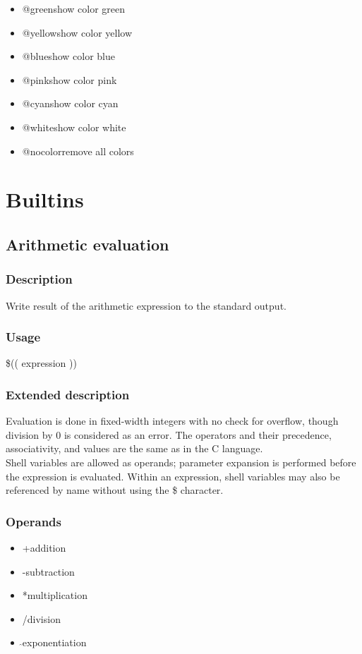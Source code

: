 \documentclass[12pt,a4paper]{report}
\begin{document}
\begin{itemize}
	\item @green\hspace{7 mm}show color green
	\item @yellow\hspace{7 mm}show color yellow
	\item @blue\hspace{7 mm}show color blue
	\item @pink\hspace{7 mm}show color pink
	\item @cyan\hspace{7 mm}show color cyan
	\item @white\hspace{7 mm}show color white
	\item @nocolor\hspace{7 mm}remove all colors
\end{itemize}
\part{Builtins}
\setcounter{chapter}{0}
\chapter{Arithmetic evaluation}
\section{Description}
Write result of the arithmetic expression to the standard output.
\section{Usage}
\$(( expression ))
\section{Extended description}
Evaluation is done in fixed-width integers with no check for overflow, though division by 0 is considered as an error.  The operators and  their  precedence,  associativity,  and values are the same as in the C language.\\
Shell variables are allowed as operands; parameter expansion is performed before the expression is evaluated.  Within an expression, shell variables may also be referenced by name without using the \$ character.
\section{Operands}
\begin{itemize}
	\item +\hspace{7 mm}addition
	\item -\hspace{7 mm}subtraction	
	\item *\hspace{7 mm}multiplication
	\item /\hspace{7 mm}division
	\item \hspace{2 mm}$\widehat{ }$\hspace{7 mm}exponentiation
\end{itemize}
\end{document}
